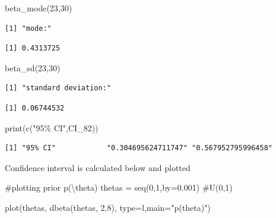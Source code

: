 \documentclass[
  letterpaper,
  DIV=11,
  numbers=noendperiod]{scrartcl}
\newenvironment{Shaded}{\begin{snugshade}}{\end{snugshade}}
\newcommand{\AttributeTok}[1]{\textcolor[rgb]{0.40,0.45,0.13}{#1}}
\newcommand{\CommentTok}[1]{\textcolor[rgb]{0.37,0.37,0.37}{#1}}
\newcommand{\DecValTok}[1]{\textcolor[rgb]{0.68,0.00,0.00}{#1}}
\newcommand{\FloatTok}[1]{\textcolor[rgb]{0.68,0.00,0.00}{#1}}
\newcommand{\FunctionTok}[1]{\textcolor[rgb]{0.28,0.35,0.67}{#1}}
\newcommand{\NormalTok}[1]{\textcolor[rgb]{0.00,0.23,0.31}{#1}}
\newcommand{\OtherTok}[1]{\textcolor[rgb]{0.00,0.23,0.31}{#1}}
\newcommand{\StringTok}[1]{\textcolor[rgb]{0.13,0.47,0.30}{#1}}
\begin{document}
\begin{Shaded}
\begin{Highlighting}[]
\FunctionTok{beta\_mode}\NormalTok{(}\DecValTok{23}\NormalTok{,}\DecValTok{30}\NormalTok{)}
\end{Highlighting}
\end{Shaded}

\begin{verbatim}
[1] "mode:"
\end{verbatim}

\begin{verbatim}
[1] 0.4313725
\end{verbatim}

\begin{Shaded}
\begin{Highlighting}[]
\FunctionTok{beta\_sd}\NormalTok{(}\DecValTok{23}\NormalTok{,}\DecValTok{30}\NormalTok{)}
\end{Highlighting}
\end{Shaded}

\begin{verbatim}
[1] "standard deviation:"
\end{verbatim}

\begin{verbatim}
[1] 0.06744532
\end{verbatim}

\begin{Shaded}
\begin{Highlighting}[]
\FunctionTok{print}\NormalTok{(}\FunctionTok{c}\NormalTok{(}\StringTok{"95\% CI"}\NormalTok{,CI\_82))}
\end{Highlighting}
\end{Shaded}

\begin{verbatim}
[1] "95% CI"            "0.304695624711747" "0.567952795996458"
\end{verbatim}

Confidence interval is calculated below and plotted

\begin{Shaded}
\begin{Highlighting}[]
\CommentTok{\#plotting prior p(\textbackslash{}theta)}
\NormalTok{thetas }\OtherTok{=} \FunctionTok{seq}\NormalTok{(}\DecValTok{0}\NormalTok{,}\DecValTok{1}\NormalTok{,}\AttributeTok{by=}\FloatTok{0.001}\NormalTok{) }\CommentTok{\#U(0,1)}

\FunctionTok{plot}\NormalTok{(thetas, }\FunctionTok{dbeta}\NormalTok{(thetas, }\DecValTok{2}\NormalTok{,}\DecValTok{8}\NormalTok{), }\AttributeTok{type=}\StringTok{\textquotesingle{}l\textquotesingle{}}\NormalTok{,}\AttributeTok{main=}\StringTok{"p(theta)"}\NormalTok{)}
\end{Highlighting}
\end{Shaded}
\end{document}
